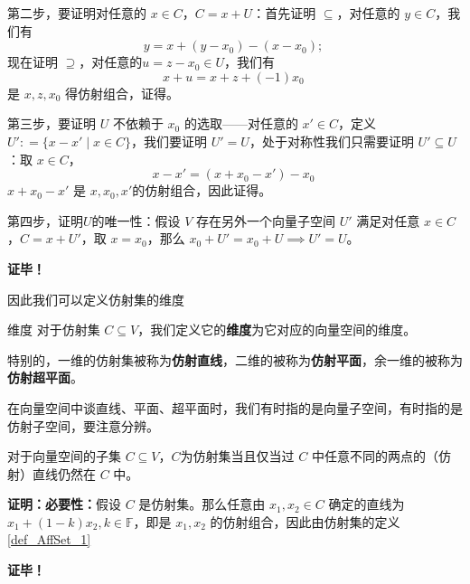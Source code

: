 第二步，要证明对任意的 $x \in C$，$C = x + U$：首先证明 $\subseteq$，对任意的 $y \in C$，我们有
\begin{equation}
y = x + (y - x_0) - (x - x_0); ~
\end{equation}
现在证明 $\supseteq$，对任意的$u  = z - x_0 \in U$，我们有
\begin{equation}
x + u = x + z + (-1) x_0 ~
\end{equation}
是 $x, z, x_0$ 得仿射组合，证得。

第三步，要证明 $U$ 不依赖于 $x_0$ 的选取——对任意的 $x' \in C$，定义 $U': = \{x - x' \mid x \in C\}$，我们要证明 $U' = U$，处于对称性我们只需要证明 $U' \subseteq U$：取 $x \in C$，
\begin{equation}
x - x' = (x + x_0 - x') - x_0 ~
\end{equation}
$x + x_0 - x'$ 是 $x, x_0, x'$的仿射组合，因此证得。

第四步，证明$U$的唯一性：假设 $V$ 存在另外一个向量子空间 $U'$ 满足对任意 $x \in C$，$C = x + U'$，取 $x = x_0$，那么 $x_0 + U' = x_0 + U \implies U' = U$。

\textbf{证毕！}

因此我们可以定义仿射集的维度
\begin{definition}{维度}
对于仿射集 $C \subseteq V$，我们定义它的\textbf{维度}为它对应的向量空间的维度。

特别的，一维的仿射集被称为\textbf{仿射直线}，二维的被称为\textbf{仿射平面}，余一维的被称为\textbf{仿射超平面}。
\end{definition}

在向量空间中谈直线、平面、超平面时，我们有时指的是向量子空间，有时指的是仿射子空间，要注意分辨。

\begin{theorem}{}
对于向量空间的子集 $C \subseteq V$，$C$为仿射集当且仅当过 $C$ 中任意不同的两点的（仿射）直线仍然在 $C$ 中。
\end{theorem}

\textbf{证明：}\textbf{必要性：}假设 $C$ 是仿射集。那么任意由 $x_1,x_2\in C$ 确定的直线为 $x_1+(1-k)x_2,k\in\mathbb F$，即是 $x_1,x_2$ 的仿射组合，因此由仿射集的定义\autoref{def_AffSet_1} 


\textbf{证毕！}

